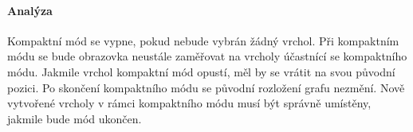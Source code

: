 \paragraph{Analýza} Kompaktní mód se vypne, pokud nebude vybrán žádný vrchol. Při kompaktním módu se bude obrazovka neustále zaměřovat na vrcholy účastnící se kompaktního módu. Jakmile vrchol kompaktní mód opustí, měl by se vrátit na svou původní pozici. Po skončení kompaktního módu se původní rozložení grafu nezmění. Nově vytvořené vrcholy v rámci kompaktního módu musí být správně umístěny, jakmile bude mód ukončen.
